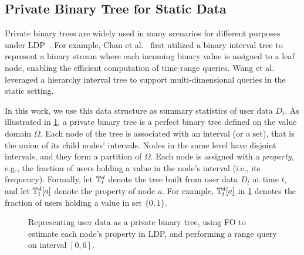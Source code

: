 \subsection{Private Binary Tree for Static Data}
\label{ss:tree}

Private binary trees are widely used in many scenarios for different
purposes under LDP~\cite{Chan2011, Honaker2015, wang2019HIO}.
For example, Chan et al.~\cite{Chan2011} first utilized a binary interval tree
to represent a binary stream where each incoming binary value is assigned to a
leaf node, enabling the efficient computation of time-range queries.
Wang et al.~\cite{wang2019HIO} leveraged a hierarchy interval tree to support
multi-dimensional queries in the static setting.

In this work, we 
use this data structure as summary statistics of user data $D_t$. 
As illustrated in \cref{fig:tree}, a private binary tree is a perfect binary
tree defined on the value domain $\Omega$.
Each node of the tree is associated with an interval (or a set), that is the
union of its child nodes' intervals.
Nodes in the same level have disjoint intervals, and they form a partition of
$\Omega$.
Each node is assigned with a \emph{property}, e.g., the fraction of users
holding a value in the node's interval (i.e., its frequency).
Formally, let $\mathbb{T}^d_t$ denote the tree built from user data $D_t$ at time $t$,
and let $\mathbb{T}^d_t[a]$ denote the property of node $a$.
For example, $\mathbb{T}^d_t[a]$ in \cref{fig:tree} denotes the fraction of users holding
a value in set $\{0,1\}$.

\begin{figure}[htp]
  \centering
  
  \caption{Representing user data as a private binary tree, using FO to estimate
    each node's property in LDP, and performing a range query on interval
    $[0,6]$.}
  \label{fig:tree}
\end{figure}

